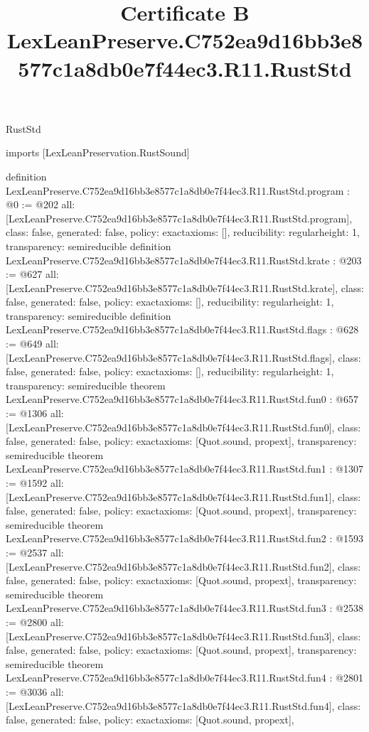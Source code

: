 \begin{lexlean}{RustStd}
\title{Certificate B LexLeanPreserve.C752ea9d16bb3e8577c1a8db0e7f44ec3.R11.RustStd}
\begin{coremodule}
imports [LexLeanPreservation.RustSound]

definition LexLeanPreserve.C752ea9d16bb3e8577c1a8db0e7f44ec3.R11.RustStd.program : @0 := @202 {
  all: [LexLeanPreserve.C752ea9d16bb3e8577c1a8db0e7f44ec3.R11.RustStd.program],
  class: false,
  generated: false,
  policy: exact{axioms: []},
  reducibility: regular{height: 1},
  transparency: semireducible
}
definition LexLeanPreserve.C752ea9d16bb3e8577c1a8db0e7f44ec3.R11.RustStd.krate : @203 := @627 {
  all: [LexLeanPreserve.C752ea9d16bb3e8577c1a8db0e7f44ec3.R11.RustStd.krate],
  class: false,
  generated: false,
  policy: exact{axioms: []},
  reducibility: regular{height: 1},
  transparency: semireducible
}
definition LexLeanPreserve.C752ea9d16bb3e8577c1a8db0e7f44ec3.R11.RustStd.flags : @628 := @649 {
  all: [LexLeanPreserve.C752ea9d16bb3e8577c1a8db0e7f44ec3.R11.RustStd.flags],
  class: false,
  generated: false,
  policy: exact{axioms: []},
  reducibility: regular{height: 1},
  transparency: semireducible
}
theorem LexLeanPreserve.C752ea9d16bb3e8577c1a8db0e7f44ec3.R11.RustStd.fun0 : @657 := @1306 {
  all: [LexLeanPreserve.C752ea9d16bb3e8577c1a8db0e7f44ec3.R11.RustStd.fun0],
  class: false,
  generated: false,
  policy: exact{axioms: [Quot.sound, propext]},
  transparency: semireducible
}
theorem LexLeanPreserve.C752ea9d16bb3e8577c1a8db0e7f44ec3.R11.RustStd.fun1 : @1307 := @1592 {
  all: [LexLeanPreserve.C752ea9d16bb3e8577c1a8db0e7f44ec3.R11.RustStd.fun1],
  class: false,
  generated: false,
  policy: exact{axioms: [Quot.sound, propext]},
  transparency: semireducible
}
theorem LexLeanPreserve.C752ea9d16bb3e8577c1a8db0e7f44ec3.R11.RustStd.fun2 : @1593 := @2537 {
  all: [LexLeanPreserve.C752ea9d16bb3e8577c1a8db0e7f44ec3.R11.RustStd.fun2],
  class: false,
  generated: false,
  policy: exact{axioms: [Quot.sound, propext]},
  transparency: semireducible
}
theorem LexLeanPreserve.C752ea9d16bb3e8577c1a8db0e7f44ec3.R11.RustStd.fun3 : @2538 := @2800 {
  all: [LexLeanPreserve.C752ea9d16bb3e8577c1a8db0e7f44ec3.R11.RustStd.fun3],
  class: false,
  generated: false,
  policy: exact{axioms: [Quot.sound, propext]},
  transparency: semireducible
}
theorem LexLeanPreserve.C752ea9d16bb3e8577c1a8db0e7f44ec3.R11.RustStd.fun4 : @2801 := @3036 {
  all: [LexLeanPreserve.C752ea9d16bb3e8577c1a8db0e7f44ec3.R11.RustStd.fun4],
  class: false,
  generated: false,
  policy: exact{axioms: [Quot.sound, propext]},
}
\end{coremodule}
\end{lexlean}
